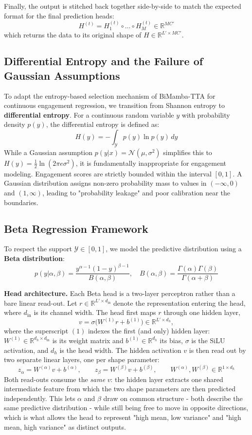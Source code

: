 \documentclass[11pt,a4paper]{article}
\newcommand{\R}{\mathbb{R}}
\begin{document}
	Finally, the output is stitched back together side-by-side to match the expected format for the final prediction heads: $$H^{(t)} = H_1^{(t)} \circ \dots \circ H_M^{(t)} \in \R^{MC'}$$ which returns the data to its original shape of $H \in \R^{L' \times MC'}$.
	
	\subsection{Differential Entropy and the Failure of Gaussian Assumptions}
	To adapt the entropy-based selection mechanism of BiMamba-TTA for continuous engagement regression, we transition from Shannon entropy to \textbf{differential entropy}. For a continuous random variable $y$ with probability density $p(y)$, the differential entropy is defined as:
	$$ H(y) = -\int_{\mathcal{Y}} p(y) \ln p(y) \, dy $$
	While a Gaussian assumption $p(y|x) = \mathcal{N}(\mu, \sigma^2)$ simplifies this to $H(y) = \frac{1}{2}\ln(2\pi e \sigma^2)$, it is fundamentally inappropriate for engagement modeling. Engagement scores are strictly bounded within the interval $[0, 1]$. A Gaussian distribution assigns non-zero probability mass to values in $(-\infty, 0)$ and $(1, \infty)$, leading to "probability leakage" and poor calibration near the boundaries.
	
	\subsection{Beta Regression Framework}
	To respect the support $\mathcal{Y} \in [0, 1]$, we model the predictive distribution using a \textbf{Beta distribution}:
	$$ p(y|\alpha, \beta) = \frac{y^{\alpha-1}(1-y)^{\beta-1}}{B(\alpha, \beta)}, \quad B(\alpha, \beta) = \frac{\Gamma(\alpha)\Gamma(\beta)}{\Gamma(\alpha+\beta)} $$
	
	\textbf{Head architecture.} Each Beta head is a two-layer perceptron rather than a bare linear read-out. Let $r \in \R^{L' \times d_{\text{in}}}$ denote the representation entering the head, where $d_{\text{in}}$ is its channel width. The head first maps $r$ through one hidden layer, $$ v = \sigma\bigl(W^{(1)} r + b^{(1)}\bigr) \in \R^{L' \times d_h}, $$ where the superscript $(1)$ indexes the first (and only) hidden layer: $W^{(1)} \in \R^{d_h \times d_{\text{in}}}$ is its weight matrix and $b^{(1)} \in \R^{d_h}$ its bias, $\sigma$ is the SiLU activation, and $d_h$ is the head width. The hidden activation $v$ is then read out by two separate linear layers, one per shape parameter:
	$$ z_\alpha = W^{(\alpha)} v + b^{(\alpha)}, \qquad z_\beta = W^{(\beta)} v + b^{(\beta)}, \qquad W^{(\alpha)}, W^{(\beta)} \in \R^{1 \times d_h}$$
	Both read-outs consume the \emph{same} $v$: the hidden layer extracts one shared intermediate feature from which the two shape parameters are then predicted independently. This lets $\alpha$ and $\beta$ draw on common structure - both describe the same predictive distribution - while still being free to move in opposite directions, which is what allows the head to represent "high mean, low variance" and "high mean, high variance" as distinct outputs.
\end{document}
